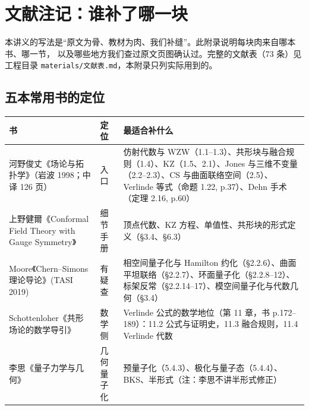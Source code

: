 \section{文献注记：谁补了哪一块}\label{app:notes}

本讲义的写法是“原文为骨、教材为肉、我们补缝”。此附录说明每块肉来自哪本书、哪一节，
以及哪些地方我们查过原文页图确认过。完整的文献表（73 条）见工程目录
\texttt{materials/文献表.md}，本附录只列实际用到的。

\subsection{五本常用书的定位}
\begin{center}
\begin{tabular}{@{}p{2.6cm}p{2.0cm}p{7.6cm}@{}}
\toprule
书 & 定位 & 最适合补什么 \\
\midrule
河野俊丈《场论与拓扑学》（岩波 1998；中译 126 页） & 入口 & 仿射代数与 WZW（1.1--1.3）、共形块与融合规则（1.4）、KZ（1.5、2.1）、Jones 与三维不变量（2.2--2.3）、CS 与曲面联络空间（2.5）、Verlinde 等式（命题 1.22, p.37）、Dehn 手术（定理 2.16, p.60） \\
上野健爾《Conformal Field Theory with Gauge Symmetry》 & 细节手册 & 顶点代数、KZ 方程、单值性、共形块的形式定义（\S3.4、\S6.3） \\
Moore《Chern--Simons 理论导论》(TASI 2019) & 有疑查 & 相空间量子化与 Hamilton 约化（\S2.2.6）、曲面平坦联络（\S2.2.7）、环面量子化（\S2.2.8--12）、标架反常（\S2.2.14--17）、模空间量子化与代数几何（\S3.4） \\
Schottenloher《共形场论的数学导引》 & 数学侧 & Verlinde 公式的数学地位（第 11 章，书 p.172--189）：11.2 公式与证明史，11.3 融合规则，11.4 Verlinde 代数 \\
李思《量子力学与几何》 & 几何量子化 & 预量子化（5.4.3）、极化与量子态（5.4.4）、BKS、半形式（注：李思不讲半形式修正） \\
\bottomrule
\end{tabular}
\end{center}

